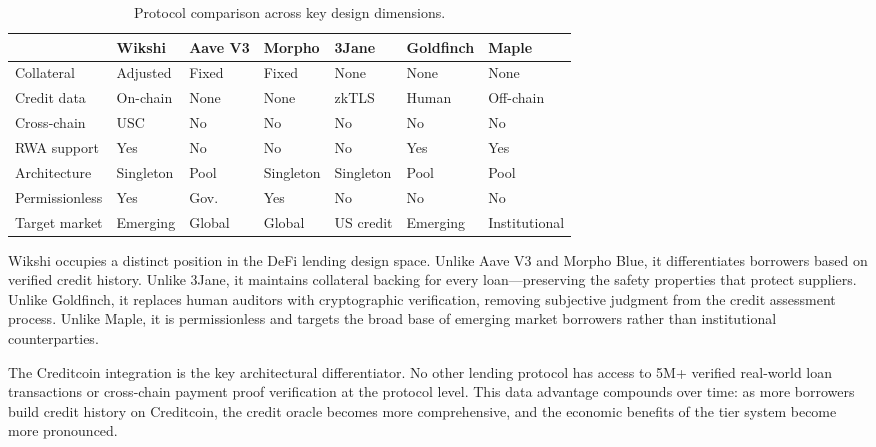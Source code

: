 \documentclass[11pt,a4paper]{article}
\begin{document}
\begin{table}[H]
\centering
\footnotesize
{}
\begin{tabularx}{\textwidth}{l C{1.6cm} C{1.6cm} C{1.5cm} C{1.5cm} C{1.5cm} C{1.5cm}}
\toprule
& \textbf{Wikshi} & \textbf{Aave V3} & \textbf{Morpho} & \textbf{3Jane} & \textbf{Goldfinch} & \textbf{Maple} \\
\midrule
Collateral & Adjusted & Fixed & Fixed & None & None & None \\
Credit data & On-chain & None & None & zkTLS & Human & Off-chain \\
Cross-chain & USC & No & No & No & No & No \\
RWA support & Yes & No & No & No & Yes & Yes \\
Architecture & Singleton & Pool & Singleton & Singleton & Pool & Pool \\
Permissionless & Yes & Gov. & Yes & No & No & No \\
Target market & Emerging & Global & Global & US credit & Emerging & Institutional \\
\bottomrule
\end{tabularx}
\caption{Protocol comparison across key design dimensions.}
\label{tab:comparison}
\end{table}

Wikshi occupies a distinct position in the DeFi lending design space. Unlike Aave V3 and Morpho Blue, it differentiates borrowers based on verified credit history. Unlike 3Jane, it maintains collateral backing for every loan---preserving the safety properties that protect suppliers. Unlike Goldfinch, it replaces human auditors with cryptographic verification, removing subjective judgment from the credit assessment process. Unlike Maple, it is permissionless and targets the broad base of emerging market borrowers rather than institutional counterparties.

The Creditcoin integration is the key architectural differentiator. No other lending protocol has access to 5M+ verified real-world loan transactions or cross-chain payment proof verification at the protocol level. This data advantage compounds over time: as more borrowers build credit history on Creditcoin, the credit oracle becomes more comprehensive, and the economic benefits of the tier system become more pronounced.

\end{document}
